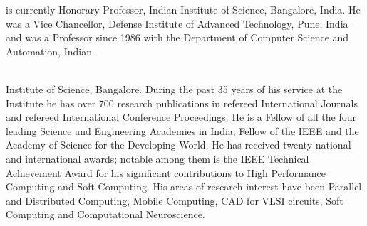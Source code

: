 \documentclass[fleqn,twoside]{article}
\begin{document}
\begin{minipage}[b][1in][c]{1.8in}
{ is currently Honorary Professor, Indian Institute of Science, Bangalore, India. He was a Vice Chancellor, Defense Institute of Advanced Technology, Pune, India and was a Professor since 1986 with the Department of Computer Science and Automation, Indian} \\ \\
\end{minipage}
Institute of Science, Bangalore. During the past 35 years of his service at the Institute he has over 700 research publications in refereed International Journals and refereed International Conference Proceedings. He is a Fellow of all the four leading Science and Engineering Academies in India;  Fellow of the IEEE and the Academy of Science for the Developing World. He has received twenty national and international awards; notable among them is the IEEE Technical Achievement Award for his significant  contributions to High Performance Computing and Soft Computing. His areas of research interest have been Parallel and Distributed Computing, Mobile Computing, CAD for VLSI circuits, Soft Computing and Computational Neuroscience.
\balance
\end{document}
